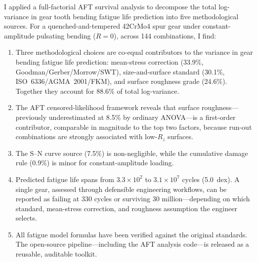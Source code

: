 \documentclass[12pt,a4paper]{article}
\begin{document}
I applied a full-factorial AFT survival analysis to decompose the total
log-variance in gear tooth bending fatigue life prediction into five
methodological sources. For a quenched-and-tempered 42CrMo4 spur gear
under constant-amplitude pulsating bending ($R=0$), across 144
combinations, I find:

\begin{enumerate}
  \item Three methodological choices are co-equal contributors to the
        variance in gear bending fatigue life prediction: mean-stress
        correction (33.9\%, Goodman/Gerber/Morrow/SWT), size-and-surface
        standard (30.1\%, ISO~6336/AGMA~2001/FKM), and surface roughness
        grade (24.6\%). Together they account for 88.6\% of total
        log-variance.
  \item The AFT censored-likelihood framework reveals that surface
        roughness---previously underestimated at 8.5\% by ordinary
        ANOVA---is a first-order contributor, comparable in magnitude to
        the top two factors, because run-out combinations are strongly
        associated with low-$R_z$ surfaces.
  \item The S--N curve source (7.5\%) is non-negligible, while the
        cumulative damage rule (0.9\%) is minor for constant-amplitude
        loading.
  \item Predicted fatigue life spans from $3.3\times10^2$ to
        $3.1\times10^7$ cycles (5.0~dex). A single gear, assessed
        through defensible engineering workflows, can be reported as
        failing at 330 cycles or surviving 30 million---depending on
        which standard, mean-stress correction, and roughness
        assumption the engineer selects.
  \item All fatigue model formulas have been verified against the
        original standards. The open-source pipeline---including
        the AFT analysis code---is released as a reusable, auditable
        toolkit.
\end{enumerate}
\end{document}
